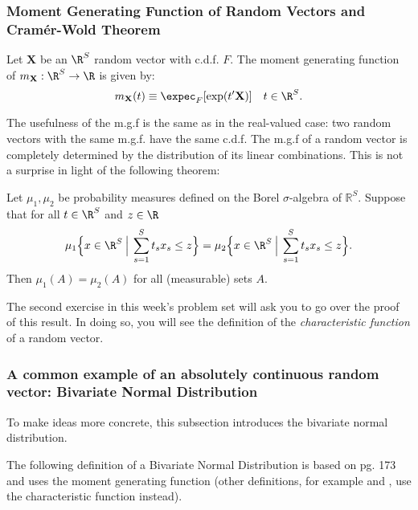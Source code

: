 \documentclass[11pt]{article} %
\begin{document}
\newpage

\subsubsection{Moment Generating Function of Random Vectors and Cram\'er-Wold Theorem}

\begin{definition}  Let $\mathbf{X}$ be an $\R^S$ random vector with c.d.f. $F$. The moment generating function of $m_{\mathbf{X}}: \R^{S} \rightarrow \R$ is given by:
$$m_{\mathbf{X}}(t) \equiv \expec_{F}[\exp(t'\mathbf{X})] \quad t \in \R^{S}.$$
\end{definition}

The usefulness of the m.g.f is the same as in the real-valued case:  two random vectors with the same m.g.f. have the same c.d.f. The m.g.f of a random vector is completely determined by the distribution of its linear combinations. This is not a surprise in light of the following theorem:

\begin{theorem}
Let $\mu_1, \mu_2$ be probability measures defined on the Borel $\sigma$-algebra of $\mathbb{R}^S$. Suppose that for all $t \in \R^S$ and $z \in \R$
$$\mu_1 \Big\{x \in \R^S \: \Big | \: \sum_{s=1}^{S} t_s x_s \leq z \Big\} = \mu_2 \Big\{x \in \R^S \: \Big | \: \sum_{s=1}^{S} t_s x_s  \leq z \Big\}.$$
\noindent Then $\mu_1(A)=\mu_2(A)$ for all (measurable) sets $A$.
\end{theorem}

\begin{prproblem}
The second exercise in this week's problem set will ask you to go over the proof of this result. In doing so, you will see the definition of the \emph{characteristic function} of a random vector. 
\end{prproblem}

\newpage

\subsubsection{A common example of an absolutely continuous random vector: Bivariate Normal Distribution}
To make ideas more concrete, this subsection introduces the bivariate normal distribution. 


The following definition of a Bivariate Normal Distribution is based on \cite{hogg} pg. 173 and uses the moment generating function (other definitions, for example \cite{Billingsley95} and \cite{durrett2010}, use the characteristic function instead).\\  
\end{document}
